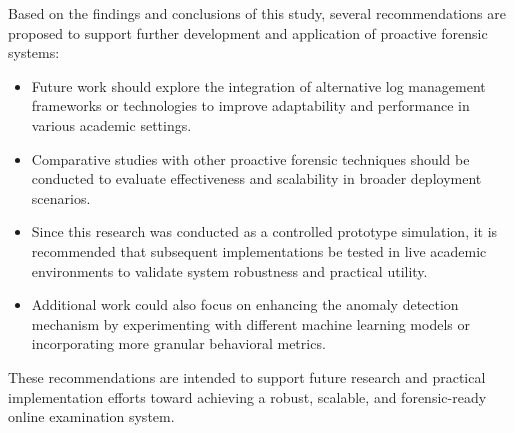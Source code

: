 Based on the findings and conclusions of this study, several recommendations are proposed to support further development and application of proactive forensic systems:

\begin{itemize}
    \item Future work should explore the integration of alternative log management frameworks or technologies to improve adaptability and performance in various academic settings.
    \item Comparative studies with other proactive forensic techniques should be conducted to evaluate effectiveness and scalability in broader deployment scenarios.
    \item Since this research was conducted as a controlled prototype simulation, it is recommended that subsequent implementations be tested in live academic environments to validate system robustness and practical utility.
    \item Additional work could also focus on enhancing the anomaly detection mechanism by experimenting with different machine learning models or incorporating more granular behavioral metrics.
\end{itemize}

These recommendations are intended to support future research and practical implementation efforts toward achieving a robust, scalable, and forensic-ready online examination system.
